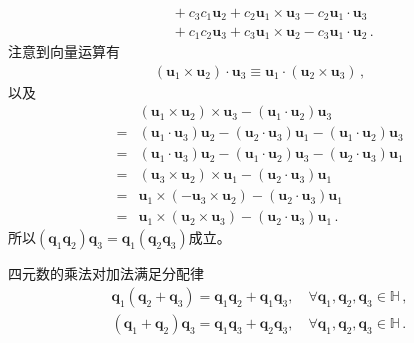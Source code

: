 \begin{prove}
\begin{align}
                                      & \quad +c_3c_1{\bm u}_2+c_2{\bm u}_1\times{\bm u}_3-c_2{\bm u}_1\cdot{\bm u}_3\nonumber                                                              \\
                                      & \quad +c_1c_2{\bm u}_3+c_3{\bm u}_1\times{\bm u}_2-c_3{\bm u}_1\cdot{\bm u}_2\, .
    \end{align}
    注意到向量运算有
    \begin{align}
        ({\bm u}_1\times{\bm u}_2)\cdot{\bm u}_3\equiv{\bm u}_1\cdot({\bm u}_2\times{\bm u}_3)\, ,
    \end{align}
    以及
    \begin{align}
          & ({\bm u}_1\times{\bm u}_2)\times{\bm u}_3-({\bm u}_1\cdot{\bm u}_2){\bm u}_3\nonumber                             \\
        = & ({\bm u}_1\cdot{\bm u}_3){\bm u}_2-({\bm u}_2\cdot{\bm u}_3){\bm u}_1-({\bm u}_1\cdot{\bm u}_2){\bm u}_3\nonumber \\
        = & ({\bm u}_1\cdot{\bm u}_3){\bm u}_2-({\bm u}_1\cdot{\bm u}_2){\bm u}_3-({\bm u}_2\cdot{\bm u}_3){\bm u}_1\nonumber \\
        = & ({\bm u}_3\times{\bm u}_2)\times{\bm u}_1-({\bm u}_2\cdot{\bm u}_3){\bm u}_1\nonumber                             \\
        = & {\bm u}_1\times(-{\bm u}_3\times{\bm u}_2)-({\bm u}_2\cdot{\bm u}_3){\bm u}_1\nonumber                            \\
        = & {\bm u}_1\times({\bm u}_2\times{\bm u}_3)-({\bm u}_2\cdot{\bm u}_3){\bm u}_1\, .
    \end{align}
    所以$({\bm q}_1{\bm q}_2){\bm q}_3={\bm q}_1({\bm q}_2{\bm q}_3)$成立。
\end{prove}
\begin{proposition}
    四元数的乘法对加法满足分配律
    \begin{align}
        {\bm q}_1({\bm q}_2+{\bm q}_3)={\bm q}_1{\bm q}_2+{\bm q}_1{\bm q}_3, \quad \forall {\bm q}_1, {\bm q}_2, {\bm q}_3\in \mathbb{H}\, , \\
        ({\bm q}_1+{\bm q}_2){\bm q}_3={\bm q}_1{\bm q}_3+{\bm q}_2{\bm q}_3, \quad \forall {\bm q}_1, {\bm q}_2, {\bm q}_3\in \mathbb{H}\, .
    \end{align}
\end{proposition}
